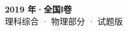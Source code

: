 \documentclass[zihao=-4, a4paper]{ctexart}
\begin{document}
\begin{center}
  {\Large\bfseries 2019 年·全国Ⅰ卷}\\[4pt]
  {\large 理科综合 · 物理部分 · 试题版}
\end{center}
\medskip
{}

\end{document}
